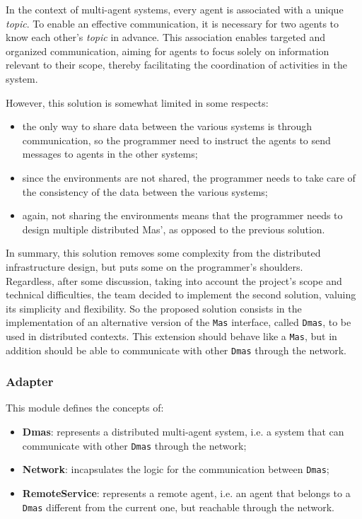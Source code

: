 In the context of multi-agent systems, every agent is associated with a unique \textit{topic}.
To enable an effective communication, it is necessary for two agents to know each other's \textit{topic} in advance.
This association enables targeted and organized communication, aiming for agents to focus solely on information relevant to their scope,
thereby facilitating the coordination of activities in the system.

However, this solution is somewhat limited in some respects:
\begin{itemize}
    \item the only way to share data between the various systems is through communication, so the programmer need to instruct the agents to send messages to agents in the other systems;
    \item since the environments are not shared, the programmer needs to take care of the consistency of the data between the various systems;
    \item again, not sharing the environments means that the programmer needs to design multiple distributed Mas', as opposed to the previous solution.
\end{itemize}

In summary, this solution removes some complexity from the distributed infrastructure design, but puts some on the programmer's shoulders.\\

Regardless, after some discussion, taking into account the project's scope and technical difficulties, the team decided to implement the second solution, valuing its simplicity and flexibility.
So the proposed solution consists in the implementation of an alternative version of the \texttt{Mas} interface, called \texttt{Dmas}, to be used in distributed contexts.
This extension should behave like a \texttt{Mas}, but in addition should be able to communicate with other \texttt{Dmas} through the network.

\subsubsection{Adapter}
This module defines the concepts of:

\begin{itemize}
    \item \textbf{Dmas}: represents a distributed multi-agent system, i.e. a system that can communicate with other \texttt{Dmas} through the network;
    \item \textbf{Network}: incapsulates the logic for the communication between \texttt{Dmas};
    \item \textbf{RemoteService}: represents a remote agent, i.e. an agent that belongs to a \texttt{Dmas} different from the current one, but reachable through the network.
\end{itemize}

